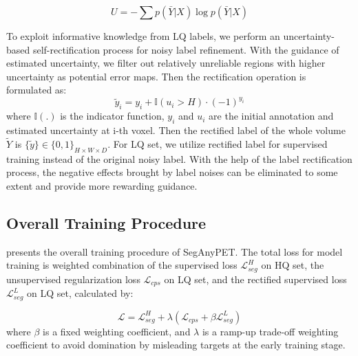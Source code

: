 \begin{equation}
U = - \sum p(\bar Y|X) \log p(\bar Y|X)
\label{unc}
\end{equation}

To exploit informative knowledge from LQ labels, we perform an uncertainty-based self-rectification process for noisy label refinement.
With the guidance of estimated uncertainty, we filter out relatively unreliable regions with higher uncertainty as potential error maps. Then the rectification operation is formulated as:
\begin{equation}
\tilde y_{i} = y_{i} + \mathbb I(u_{i}>H) \cdot (-1)^{y_{i}}
\label{rec}
\end{equation}
where $\mathbb I(.)$ is the indicator function, $y_{i}$ and $u_{i}$ are the initial annotation and estimated uncertainty at i-th voxel. Then the rectified label of the whole volume $\tilde Y$ is $\{\tilde y\} \in \{0,1\}_{H \times W \times D}$.
For LQ set, we utilize rectified label for supervised training instead of the original noisy label.
With the help of the label rectification process, the negative effects brought by label noises can be eliminated to some extent and provide more rewarding guidance.







\subsection{Overall Training Procedure}

 presents the overall training procedure of SegAnyPET. The total loss for model training is weighted combination of the supervised loss $\mathcal{L}^{H}_{seg}$ on HQ set, the unsupervised regularization loss $\mathcal{L}_{cps}$ on LQ set, and the rectified supervised loss $\mathcal{L}^{L}_{seg}$ on LQ set, calculated by:

\begin{equation}
\mathcal{L} = \mathcal{L}^{H}_{seg} + \lambda (\mathcal{L}_{cps} + \beta \mathcal{L}^{L}_{seg})
\end{equation}
where $\beta$ is a fixed weighting coefficient, and $\lambda$ is a ramp-up trade-off weighting coefficient to avoid domination by misleading targets at the early training stage.